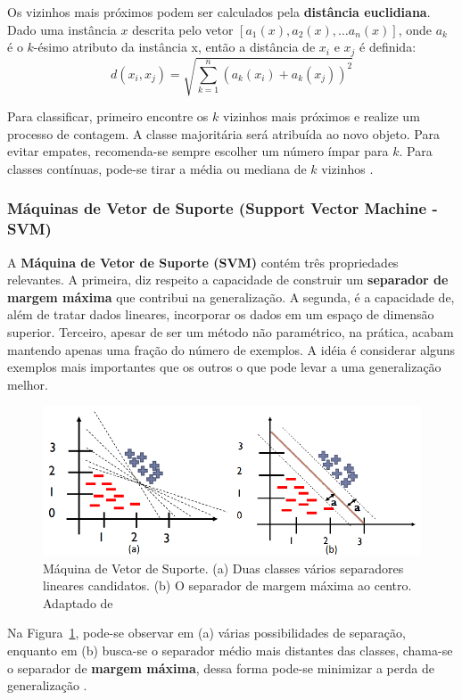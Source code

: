 \documentclass[12pt]{article}
\begin{document}
Os vizinhos mais próximos podem ser calculados pela \textbf{distância euclidiana}. Dado uma instância $x$ descrita pelo vetor $[a_1(x), a_2(x), \ldots a_n(x)]$, onde $a_k$ é o $k$-ésimo atributo da instância x, então a distância de $x_i$ e $x_j$ é definida:
\begin{equation}
  d(x_i, x_j) = \sqrt{\sum_{k = 1}^{n} (a_k(x_i) + a_k(x_j))^2 }
\end{equation}

Para classificar, primeiro encontre os $k$ vizinhos mais próximos e realize um processo de contagem. A classe majoritária será atribuída ao novo objeto. Para evitar empates, recomenda-se sempre escolher um número ímpar para $k$. Para classes contínuas, pode-se tirar a média ou mediana de $k$ vizinhos \cite{mitchell:1997,stuartnorvig:2013}.

\subsubsection{Máquinas de Vetor de Suporte (Support Vector Machine - SVM)}
A \textbf{Máquina de Vetor de Suporte (SVM)} contém três propriedades relevantes. A primeira, diz respeito a capacidade de construir um \textbf{separador de margem máxima} que contribui na generalização. A segunda, é a capacidade de, além de tratar dados lineares, incorporar os dados em um espaço de dimensão superior. Terceiro, apesar de ser um método não paramétrico, na prática, acabam mantendo apenas uma fração do número de exemplos. A idéia é considerar alguns exemplos mais importantes que os outros o que pode levar a uma generalização melhor.

\begin{figure}[h]
  \centering
  \includegraphics[width=.5\textwidth]{img/fig_svm.png}
  \caption{Máquina de Vetor de Suporte. (a) Duas classes vários separadores lineares candidatos. (b) O separador de margem máxima ao centro. Adaptado de \cite{bruno:2020}}
  \label{fig_svm}
\end{figure}

Na Figura~\ref{fig_svm}, pode-se observar em (a) várias possibilidades de separação, enquanto em (b) busca-se o separador médio mais distantes das classes, chama-se o separador de \textbf{margem máxima}, dessa forma pode-se minimizar a perda de generalização \cite{stuartnorvig:2013}.
\end{document}
